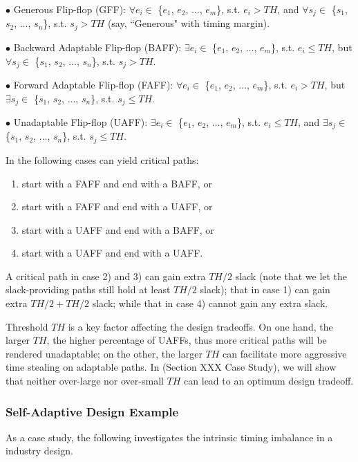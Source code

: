 $\bullet$ Generous Flip-flop (GFF):  $\forall e_i\in$ \{$e_1$, $e_2$, $\ldots$,
$e_m$\}, s.t. $e_i>TH$, and $\forall s_j\in$ \{$s_1$, $s_2$, $\ldots$, $s_n$\}, s.t. $s_j>TH$ (say, ``Generous" with timing margin).

$\bullet$ Backward Adaptable Flip-flop (BAFF):  $\exists e_i\in$ \{$e_1$, $e_2$, $\ldots$,
$e_m$\}, s.t. $e_i\leq TH$, but $\forall s_j\in$ \{$s_1$, $s_2$, $\ldots$, $s_n$\}, s.t. $s_j>TH$.

$\bullet$ Forward Adaptable Flip-flop (FAFF):  $\forall e_i \in$ \{$e_1$, $e_2$, $\ldots$,
$e_m$\}, s.t. $e_i>TH$, but $\exists s_j\in$ \{$s_1$, $s_2$, $\ldots$, $s_n$\}, s.t. $s_j\leq TH$.


$\bullet$ Unadaptable Flip-flop (UAFF):  $\exists e_i\in$ \{$e_1$, $e_2$, $\ldots$,
$e_m$\}, s.t. $e_i\leq TH$, and $\exists s_j\in$ \{$s_1$, $s_2$, $\ldots$, $s_n$\}, s.t. $s_j\leq TH$.


In the following cases can yield critical paths:
\begin{enumerate}
\item  start with a FAFF and end with a BAFF, or
\item  start with a FAFF and end with a UAFF, or
\item  start with a UAFF and end with a BAFF, or
\item  start with a UAFF and end with a UAFF.
\end{enumerate}

A critical path in case 2) and 3) can gain extra $TH/2$ slack (note that we let the slack-providing paths still hold at least $TH/2$ slack); that in case 1) can gain extra $TH/2+TH/2$ slack; while that in case 4) cannot gain any extra slack.


Threshold $TH$ is a key factor affecting the design tradeoffs. On one hand, the larger $TH$, the higher percentage of UAFFs, thus more critical paths will be rendered unadaptable; on the other, the larger $TH$ can facilitate more aggressive time stealing on adaptable paths. In (Section XXX Case Study), we will show that neither over-large nor over-small $TH$ can lead to an optimum design tradeoff.

\subsubsection{Self-Adaptive Design Example}
As a case study, the following investigates the intrinsic timing imbalance in a industry design.

